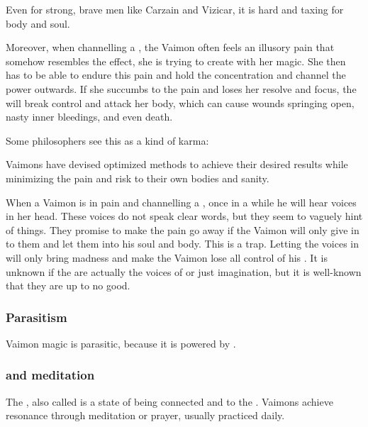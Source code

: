 Even for strong, brave men like Carzain and Vizicar, it is hard and taxing for body and soul. 

Moreover, when channelling a \qliphah, the Vaimon often feels an illusory pain that somehow resembles the effect, she is trying to create with her magic.   
She then has to be able to endure this pain and hold the concentration and channel the power outwards. 
If she succumbs to the pain and loses her resolve and focus, the \qliphah{} will break control and attack her body, which can cause wounds springing open, nasty inner bleedings, and even death. 

Some philosophers see this as a kind of karma: 

\Itzach{} Vaimons have devised optimized methods to achieve their desired results while minimizing the pain and risk to their own bodies and sanity. 

When a Vaimon is in pain and channelling a \qliphah, once in a while he will hear voices in her head. 
These voices do not speak clear words, but they seem to vaguely hint of things. 
They promise to make the pain go away if the Vaimon will only give in to them and let them into his soul and body. 
This is a trap. 
Letting the voices in will only bring madness and make the Vaimon lose all control of his \qliphoth. 
It is unknown if the  are actually the voices of \qliphoth{} or just imagination, but it is well-known that they are up to no good. 





\subsubsection{Parasitism}
Vaimon magic is parasitic, because it is powered by . 





\subsubsection{\Shechinah{} and meditation}
\index{\shechinah}
The \shechinah, also called  is a state of being connected and  to the \Archons. 
Vaimons achieve resonance through meditation or prayer, usually practiced daily. 

